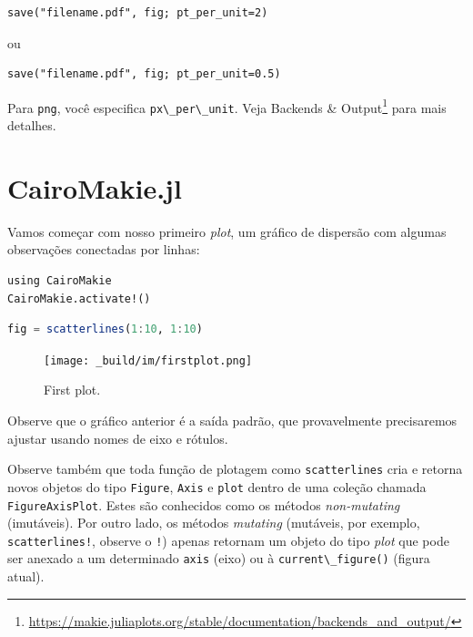 \documentclass[
  notoc %
]{tufte-book}
\DeclareRobustCommand{\href}[2]{#2\footnote{\url{#1}}}
\newcommand{\passthrough}[1]{#1}
\begin{document}
\begin{lstlisting}
save("filename.pdf", fig; pt_per_unit=2)
\end{lstlisting}

ou

\begin{lstlisting}
save("filename.pdf", fig; pt_per_unit=0.5)
\end{lstlisting}

Para \passthrough{\lstinline!png!}, você especifica
\passthrough{\lstinline!px\_per\_unit!}. Veja
\href{https://makie.juliaplots.org/stable/documentation/backends_and_output/}{Backends
\& Output} para mais detalhes.

\hypertarget{sec:cairomakie}{%
\section{CairoMakie.jl}\label{sec:cairomakie}}

Vamos começar com nosso primeiro \emph{plot}, um gráfico de dispersão
com algumas observações conectadas por linhas:

\begin{lstlisting}
using CairoMakie
CairoMakie.activate!()
\end{lstlisting}

\begin{lstlisting}[language=Julia]
fig = scatterlines(1:10, 1:10)
\end{lstlisting}

\begin{figure}
\hypertarget{fig:firstplot}{%
\centering
\texttt{[image: \_build/im/firstplot.png]}
\caption{First plot.}\label{fig:firstplot}
}
\end{figure}

Observe que o gráfico anterior é a saída padrão, que provavelmente
precisaremos ajustar usando nomes de eixo e rótulos.

Observe também que toda função de plotagem como
\passthrough{\lstinline!scatterlines!} cria e retorna novos objetos do
tipo \passthrough{\lstinline!Figure!}, \passthrough{\lstinline!Axis!} e
\passthrough{\lstinline!plot!} dentro de uma coleção chamada
\passthrough{\lstinline!FigureAxisPlot!}. Estes são conhecidos como os
métodos \emph{non-mutating} (imutáveis). Por outro lado, os métodos
\emph{mutating} (mutáveis, por exemplo,
\passthrough{\lstinline"scatterlines!"}, observe o
\passthrough{\lstinline"!"}) apenas retornam um objeto do tipo
\emph{plot} que pode ser anexado a um determinado
\passthrough{\lstinline!axis!} (eixo) ou à
\passthrough{\lstinline!current\_figure()!} (figura atual).
\end{document}
